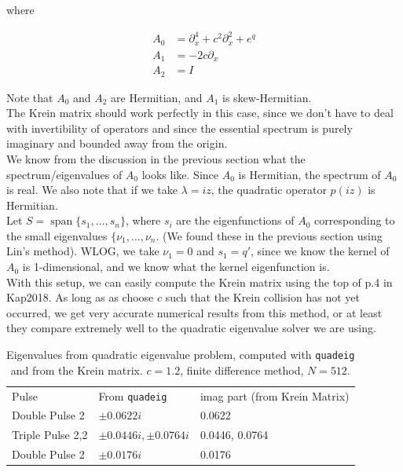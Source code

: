 \documentclass[12pt]{article}
\DeclareMathOperator{\spn}{span}
\begin{document}
where

\begin{align*}
A_0 &= \partial_x^4 + c^2 \partial_x^2 + e^{q} \\
A_1 &= - 2 c \partial_x \\
A_2 &= I 
\end{align*}

Note that $A_0$ and $A_2$ are Hermitian, and $A_1$ is skew-Hermitian.\\

The Krein matrix should work perfectly in this case, since we don't have to deal with invertibility of operators and since the essential spectrum is purely imaginary and bounded away from the origin.\\

We know from the discussion in the previous section what the spectrum/eigenvalues of $A_0$ looks like. Since $A_0$ is Hermitian, the spectrum of $A_0$ is real. We also note that if we take $\lambda = i z$, the quadratic operator $p(iz)$ is Hermitian.
\\

Let $S = \spn\{s_1, \dots, s_n \}$, where $s_i$ are the eigenfunctions of $A_0$ corresponding to the small eigenvalues $\{\nu_1, \dots, \nu_n$. (We found these in the previous section using Lin's method). WLOG, we take $\nu_1 = 0$ and $s_1 = q'$, since we know the kernel of $A_0$ is 1-dimensional, and we know what the kernel eigenfunction is.\\

With this setup, we can easily compute the Krein matrix using the top of p.4 in Kap2018. As long as as choose $c$ such that the Krein collision has not yet occurred, we get very accurate numerical results from this method, or at least they compare extremely well to the quadratic eigenvalue solver we are using. 

\begin{table}[H]
\begin{tabular}{lll}
Pulse & From \texttt{quadeig} & imag part (from Krein Matrix) \\
Double Pulse 2    & $\pm 0.0622i$ & 0.0622 \\
Triple Pulse 2,2  & $\pm 0.0446i, \pm 0.0764i$ & 0.0446, 0.0764 \\
Double Pulse 2    & $\pm 0.0176i$ & 0.0176 \\
\end{tabular}
\caption{Eigenvalues from quadratic eigenvalue problem, computed with \texttt{quadeig} and from the Krein matrix. $c = 1.2$, finite difference method, $N = 512$. }
\end{table}
\end{document}
